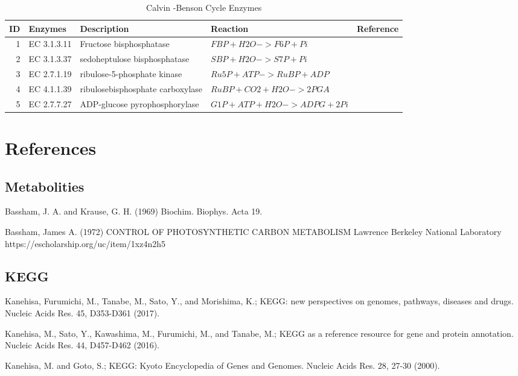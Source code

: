\centering
\begin{table}[H]\footnotesize
	\caption{Calvin -Benson Cycle Enzymes}
	\begin{tabular}{rp{1cm}p{2cm}p{3cm}p{1cm}}
		\hline
		ID & Enzymes & Description & Reaction & Reference \\
		\hline
		1 & EC 3.1.3.11 & Fructose bisphosphatase & $FBP + H2O->F6P + Pi$ &\cite{key4000} \\
		2 & EC 3.1.3.37 &  sedoheptulose bisphosphatase &$SBP + H2O->S7P + Pi$ &\cite{key4000} \\
		3 & EC 2.7.1.19 & ribulose-5-phosphate kinase & $Ru5P + ATP->RuBP + ADP$ & \cite{key4000} \\
		4 & EC 4.1.1.39 &  ribulosebisphosphate carboxylase & $RuBP + CO2+ H2O->2 PGA$ & \cite{key4000} \\
		5 & EC 2.7.7.27 &  ADP-glucose pyrophosphorylase  &$G1P + ATP + H2O->ADPG + 2 Pi$ & \cite{key4000} \\
		\hline
	\end{tabular}
\end{table}
\raggedright


\section{References}


\subsection{Metabolities}

 Bassham, J. A.  and Krause, G. H. (1969) 
\newblock Biochim. Biophys. Acta 19. 

Bassham, James A. (1972)
\newblock CONTROL OF PHOTOSYNTHETIC CARBON METABOLISM
\newblock Lawrence Berkeley National Laboratory https://escholarship.org/uc/item/1xz4n2h5


\subsection{KEGG}

 Kanehisa, Furumichi, M., Tanabe, M., Sato, Y., and Morishima, K.; 
\newblock KEGG: new perspectives on genomes, pathways, diseases and drugs. 
\newblock Nucleic Acids Res. 45, D353-D361 (2017).

 Kanehisa, M., Sato, Y., Kawashima, M., Furumichi, M., and Tanabe, M.; 
\newblock KEGG as a reference resource for gene and protein annotation. 
\newblock Nucleic Acids Res. 44, D457-D462 (2016).

 Kanehisa, M. and Goto, S.; 
\newblock KEGG: Kyoto Encyclopedia of Genes and Genomes. 
\newblock Nucleic Acids Res. 28, 27-30 (2000). 